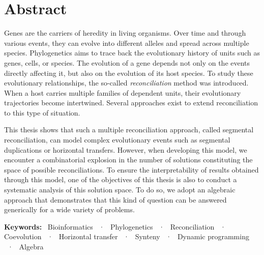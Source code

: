 \chapter*{Abstract}

Genes are the carriers of heredity in living organisms.
Over time and through various events, they can evolve into different alleles and spread across multiple species.
Phylogenetics aims to trace back the evolutionary history of units such as genes, cells, or species.
The evolution of a gene depends not only on the events directly affecting it, but also on the evolution of its host species.
To study these evolutionary relationships, the so-called \emph{reconciliation} method was introduced.
When a host carries multiple families of dependent units, their evolutionary trajectories become intertwined.
Several approaches exist to extend reconciliation to this type of situation.

This thesis shows that such a multiple reconciliation approach, called segmental reconciliation, can model complex evolutionary events such as segmental duplications or horizontal transfers.
However, when developing this model, we encounter a combinatorial explosion in the number of solutions constituting the space of possible reconciliations.
To ensure the interpretability of results obtained through this model, one of the objectives of this thesis is also to conduct a systematic analysis of this solution space.
To do so, we adopt an algebraic approach that demonstrates that this kind of question can be answered generically for a wide variety of problems.

\textbf{Keywords:}
\  Bioinformatics
~·~ Phylogenetics
~·~ Reconciliation
~·~ Coevolution
~·~ Horizontal transfer
~·~ Synteny
~·~ Dynamic programming
~·~ Algebra
